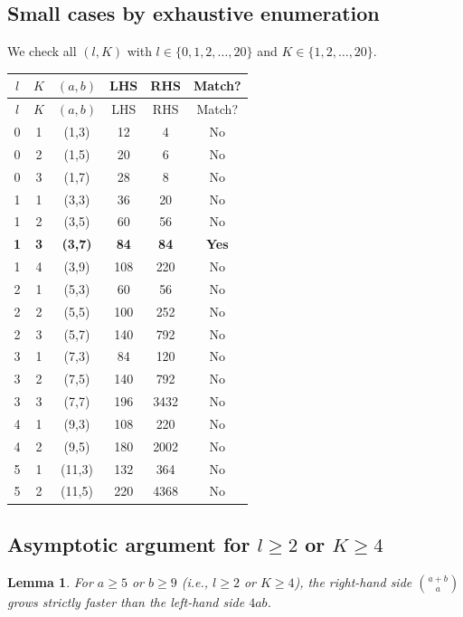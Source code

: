 \documentclass[11pt,letterpaper]{article}
\newtheorem{lemma}[theorem]{Lemma}
\numberwithin{equation}{section}
\begin{document}
\subsection{Small cases by exhaustive enumeration}

We check all $(l, K)$ with $l \in \{0, 1, 2, \ldots, 20\}$ and
$K \in \{1, 2, \ldots, 20\}$.

\begin{longtable}{ccc|cc|c}
\toprule
$l$ & $K$ & $(a,b)$ & LHS & RHS & Match? \\
\midrule
\endfirsthead
\toprule
$l$ & $K$ & $(a,b)$ & LHS & RHS & Match? \\
\midrule
\endhead
0 & 1 & (1,3) & 12 & 4 & No \\
0 & 2 & (1,5) & 20 & 6 & No \\
0 & 3 & (1,7) & 28 & 8 & No \\
1 & 1 & (3,3) & 36 & 20 & No \\
1 & 2 & (3,5) & 60 & 56 & No \\
\textbf{1} & \textbf{3} & \textbf{(3,7)} & \textbf{84} & \textbf{84} & \textbf{Yes} \\
1 & 4 & (3,9) & 108 & 220 & No \\
2 & 1 & (5,3) & 60 & 56 & No \\
2 & 2 & (5,5) & 100 & 252 & No \\
2 & 3 & (5,7) & 140 & 792 & No \\
3 & 1 & (7,3) & 84 & 120 & No \\
3 & 2 & (7,5) & 140 & 792 & No \\
3 & 3 & (7,7) & 196 & 3432 & No \\
4 & 1 & (9,3) & 108 & 220 & No \\
4 & 2 & (9,5) & 180 & 2002 & No \\
5 & 1 & (11,3) & 132 & 364 & No \\
5 & 2 & (11,5) & 220 & 4368 & No \\
\bottomrule
\end{longtable}

\subsection{Asymptotic argument for $l \geq 2$ or $K \geq 4$}

\begin{lemma}
\label{lem:growth}
For $a \geq 5$ or $b \geq 9$ (i.e., $l \geq 2$ or $K \geq 4$), the
right-hand side $\binom{a+b}{a}$ grows strictly faster than the left-hand
side $4ab$.
\end{lemma}
\end{document}
